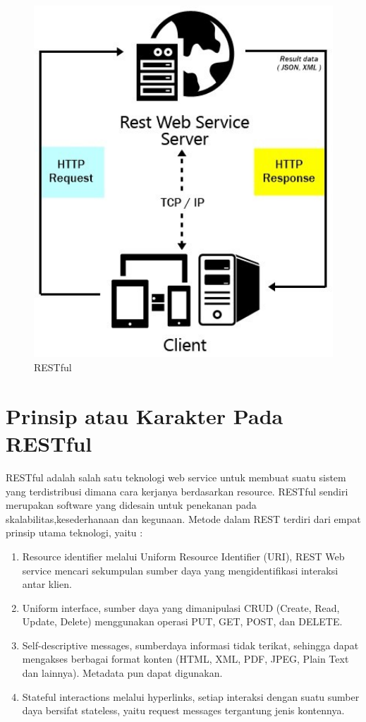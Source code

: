 \begin{figure}[ht]
\centerline{\includegraphics[width=1\textwidth]{figures/1restful.JPG}}
\caption{RESTful}
\label{labelgambar}
\end{figure}

\section{Prinsip atau Karakter Pada RESTful}
RESTful adalah salah satu teknologi web service untuk membuat suatu sistem yang terdistribusi dimana cara kerjanya berdasarkan resource. RESTful sendiri merupakan software yang didesain untuk penekanan pada skalabilitas,kesederhanaan dan kegunaan. Metode dalam REST terdiri dari empat prinsip utama teknologi, yaitu \cite{aji2016penerapan}:
\begin{enumerate}
\item Resource identifier melalui Uniform Resource Identifier (URI), REST Web service mencari sekumpulan sumber daya yang mengidentifikasi interaksi antar klien.
\item Uniform interface, sumber daya yang dimanipulasi CRUD (Create, Read, Update, Delete) menggunakan operasi PUT, GET, POST, dan DELETE.
\item Self-descriptive messages, sumberdaya informasi tidak terikat, sehingga dapat mengakses berbagai format konten (HTML, XML, PDF, JPEG, Plain Text dan lainnya). Metadata pun dapat digunakan.
\item Stateful interactions melalui hyperlinks, setiap interaksi dengan suatu sumber daya bersifat stateless, yaitu request messages tergantung jenis kontennya.
\end{enumerate}

